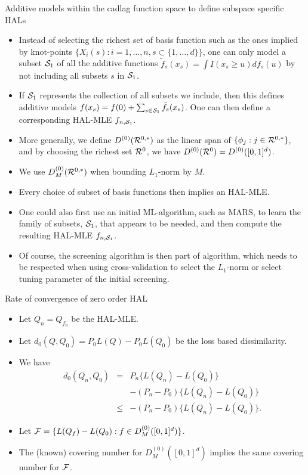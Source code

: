 \documentclass[t]{beamer}
\begin{document}
\begin{frame}{Additive models within the cadlag function space to define subspace specific HALs}
\begin{itemize}
\item Instead of selecting the richest set of basis function such as the ones implied by knot-points
$\{X_i(s): i=1,\ldots,n,s\subset\{1,\ldots,d\}\}$, one can only model a subset ${\cal S}_1$ of all the additive functions $\tilde{f}_s(x_s)=\int I(x_s\geq u) df_s(u)$  by not including all subsets $s$ in ${\cal S}_1$.
\item If ${\cal S}_1$ represents the collection of all subsets we include, then this defines additive models $f(x_s)=f(0)+\sum_{s\in {\cal S}_1}\tilde{f}_s(x_s)$. One can then define a corresponding HAL-MLE $f_{n,{\cal S}_1}$.
\item More generally, we define $D^{(0)}({\cal R}^{0,*})$ as the linear span of $\{\phi_j: j\in {\cal R}^{0,*}\}$, and by choosing the richest set ${\cal R}^0$, we have $D^{(0)}({\cal R}^0)=D^{(0)}([0,1]^d)$.
\item We use $D^{(0)}_M({\cal R}^{0,*})$ when bounding $L_1$-norm by $M$.
\end{itemize}
\end{frame}
\begin{frame}
\begin{itemize}
\item Every choice of subset of basis functions then implies an HAL-MLE.
\item One could also first use an initial ML-algorithm, such as MARS, to learn the family of subsets, ${\cal S}_1$, that appears to be needed, and then compute the resulting HAL-MLE $f_{n,{\cal S}_1}$.
\item Of course, the screening algorithm is then part of algorithm, which needs to be respected when using cross-validation to select the $L_1$-norm or select tuning parameter of the initial screening.
\end{itemize}
\end{frame}

\begin{frame}{Rate of convergence of zero order HAL}
\begin{itemize}
\item Let $Q_n=Q_{f_n}$ be the HAL-MLE.
\item Let $d_0(Q,Q_0)=P_0L(Q)-P_0L(Q_0)$ be the loss based dissimilarity.
\item We  have
\begin{eqnarray*}
d_0(Q_n,Q_0)&=&P_n\{ L(Q_n)-L(Q_0)\}\\
&&-(P_n-P_0)\{L(Q_n)-L(Q_0)\}\\
&\leq &- (P_n-P_0)\{L(Q_n)-L(Q_0)\}.
\end{eqnarray*}
\item Let ${\cal F}=\{L(Q_f)-L(Q_0):f\in D^{(0)}_M([0,1]^d)\}$.
\item The (known) covering number for $D^{(0)}_M([0,1]^d)$ implies the same covering number for ${\cal F}$.
\end{itemize}
\end{frame}
\end{document}
